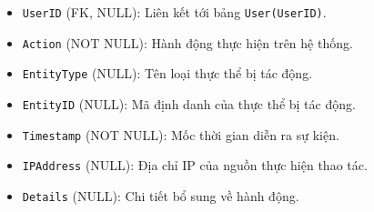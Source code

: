 \begin{itemize}[leftmargin=2em]
\begin{itemize}
        \item \texttt{UserID} (FK, NULL): Liên kết tới bảng \texttt{User(UserID)}.
        \item \texttt{Action} (NOT NULL): Hành động thực hiện trên hệ thống.
        \item \texttt{EntityType} (NULL): Tên loại thực thể bị tác động.
        \item \texttt{EntityID} (NULL): Mã định danh của thực thể bị tác động.
        \item \texttt{Timestamp} (NOT NULL): Mốc thời gian diễn ra sự kiện.
        \item \texttt{IPAddress} (NULL): Địa chỉ IP của nguồn thực hiện thao tác.
        \item \texttt{Details} (NULL): Chi tiết bổ sung về hành động.
    \end{itemize}
\end{itemize}
